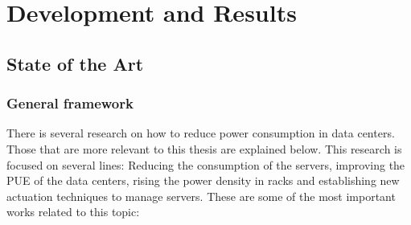 \chapter{Development and Results}


\clearpage



\clearpage


\clearpage


\section{State of the Art}
\subsection{General framework}

There is several research on how to reduce power consumption in data centers. Those that are more relevant to this thesis are explained below. This research is focused on several lines: Reducing the consumption of the servers, improving the PUE of the data centers, rising the power density in racks and establishing new actuation techniques to manage servers. These are some of the most important works related to this topic:

